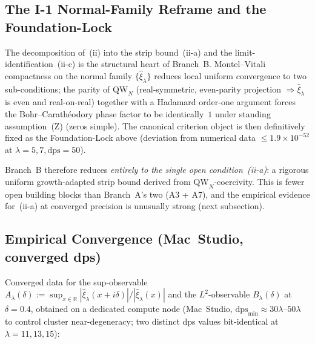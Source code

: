 \documentclass[12pt,a4paper]{article}
\theoremstyle{definition}
\theoremstyle{remark}
\begin{document}
\subsection{The I-1 Normal-Family Reframe and the Foundation-Lock}
\label{sec:i1-reframe}

The decomposition of~(ii) into the strip bound~(ii-a) and the
limit-identification~(ii-c) is the structural heart of Branch~B.
Montel--Vitali compactness on the normal family $\{\hat\xi_\lambda\}$
reduces local uniform convergence to two sub-conditions; the parity of
$\mathrm{QW}_N$ (real-symmetric, even-parity projection $\Rightarrow
\hat\xi_\lambda$ is even and real-on-real) together with a Hadamard
order-one argument forces the Bohr--Carath\'eodory phase factor to be
identically~$1$ under standing assumption~(Z) (zeros simple). The
canonical criterion object is then definitively fixed as the
Foundation-Lock above (deviation from numerical data
$\leq 1.9\times 10^{-52}$ at $\lambda=5,7,\mathrm{dps}=50$).

Branch~B therefore reduces \emph{entirely to the single open
condition~(ii-a)}: a rigorous uniform growth-adapted strip bound derived
from $\mathrm{QW}_N$-coercivity. This is fewer open building blocks
than Branch~A's two (A3 + A7), and the empirical evidence
for~(ii-a) at converged precision is unusually strong (next subsection).


\subsection{Empirical Convergence (Mac~Studio, converged dps)}
\label{sec:branch-b-empirics}

Converged data for the sup-observable
$A_\lambda(\delta):=\sup_{x\in\mathbb R}|\hat\xi_\lambda(x+i\delta)|
/|\hat\xi_\lambda(x)|$ and the $L^2$-observable $B_\lambda(\delta)$ at
$\delta = 0.4$, obtained on a dedicated compute node (Mac~Studio,
$\mathrm{dps}_{\min}\approx 30\lambda$--$50\lambda$ to control cluster
near-degeneracy; two distinct dps values bit-identical at
$\lambda=11,13,15$):
\end{document}
